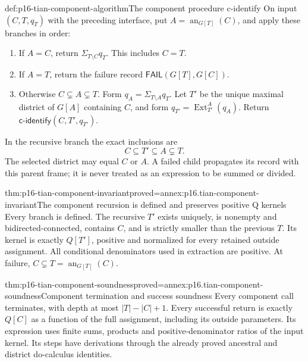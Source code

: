 \begin{hbmethod}{def:p16-tian-component-algorithm}{The component procedure c-identify}
On input \((C,T,q_T)\) with the preceding interface, put
\(A=\operatorname{an}_{G[T]}(C)\), and apply these branches in order:
\begin{enumerate}
\item If \(A=C\), return \(\Sigma_{T\setminus C}q_T\).
      This includes \(C=T\).
\item If \(A=T\), return the failure record
      \(\mathsf{FAIL}(G[T],G[C])\).
\item Otherwise \(C\subsetneq A\subsetneq T\). Form
      \(q_A=\Sigma_{T\setminus A}q_T\). Let \(T'\) be the
      unique maximal district of \(G[A]\) containing \(C\),
      and form \(q_{T'}=\operatorname{Ext}^A_{T'}(q_A)\).
      Return \(\mathsf{c\mbox{-}identify}(C,T',q_{T'})\).
\end{enumerate}
In the recursive branch the exact inclusions are
\[
 C\subseteq T'\subseteq A\subsetneq T.
\]
The selected district may equal \(C\) or \(A\). A failed
child propagates its record with this parent frame; it is never
treated as an expression to be summed or divided.
\end{hbmethod}

\begin{hblemma}{thm:p16-tian-component-invariant}{proved=annex:p16.tian-component-invariant}{The component recursion is defined and preserves positive Q kernels}
Every branch is defined. The recursive \(T'\) exists uniquely,
is nonempty and bidirected-connected, contains \(C\), and is
strictly smaller than the previous \(T\). Its kernel is exactly
\(Q[T']\), positive and normalized for every retained outside
assignment. All conditional denominators used in extraction are
positive. At failure, \(C\subsetneq T=\operatorname{an}_{G[T]}(C)\).
\end{hblemma}

\begin{hbtheorem}{thm:p16-tian-component-soundness}{proved=annex:p16.tian-component-soundness}{Component termination and success soundness}
Every component call terminates, with depth at most
\(|T|-|C|+1\). Every successful return is exactly \(Q[C]\)
as a function of the full assignment, including its outside parameters.
Its expression uses finite sums, products and positive-denominator ratios
of the input kernel. Its steps have derivations through the already
proved ancestral and district do-calculus identities.
\end{hbtheorem}

